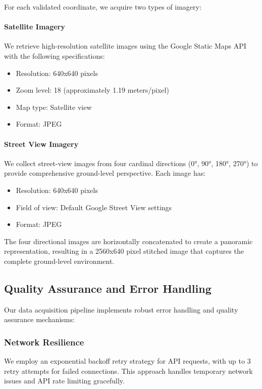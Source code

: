 For each validated coordinate, we acquire two types of imagery:

\paragraph{Satellite Imagery} We retrieve high-resolution satellite images using the Google Static Maps API with the following specifications:
\begin{itemize}
    \item Resolution: 640x640 pixels
    \item Zoom level: 18 (approximately 1.19 meters/pixel)
    \item Map type: Satellite view
    \item Format: JPEG
\end{itemize}

\paragraph{Street View Imagery} We collect street-view images from four cardinal directions (0°, 90°, 180°, 270°) to provide comprehensive ground-level perspective. Each image has:
\begin{itemize}
    \item Resolution: 640x640 pixels
    \item Field of view: Default Google Street View settings
    \item Format: JPEG
\end{itemize}

The four directional images are horizontally concatenated to create a panoramic representation, resulting in a 2560x640 pixel stitched image that captures the complete ground-level environment.

\subsection{Quality Assurance and Error Handling}

Our data acquisition pipeline implements robust error handling and quality assurance mechanisms:

\subsubsection{Network Resilience}
We employ an exponential backoff retry strategy for API requests, with up to 3 retry attempts for failed connections. This approach handles temporary network issues and API rate limiting gracefully.

